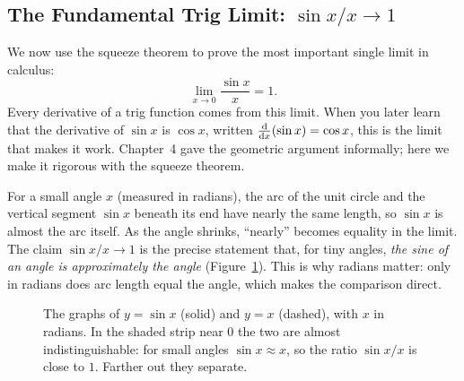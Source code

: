 \subsection{The Fundamental Trig Limit: $\sin x / x \to 1$}
\label{ch07:sinx}

We now use the squeeze theorem to prove the most important single limit in
calculus:
\[
  \boxed{\;\lim_{x\to 0}\frac{\sin x}{x} = 1.\;}
\]
Every derivative of a trig function comes from this limit.
When you later learn that the derivative of $\sin x$ is $\cos x$, written
$\frac{\mathrm{d}}{\mathrm{d} x}\!\left(\sin x\right) = \cos x$, this is the limit that makes it work.
Chapter~4 gave the geometric argument informally; here we make it rigorous with the squeeze theorem.

\begin{intuitionbox}
For a small angle $x$ (measured in radians), the arc of the unit circle and the
vertical segment $\sin x$ beneath its end have nearly the same length, so
$\sin x$ is almost the arc itself. As the angle shrinks, ``nearly'' becomes equality in the limit. The claim
$\sin x/x \to 1$ is the precise statement that, for tiny angles, \emph{the sine
of an angle is approximately the angle}
(Figure~\ref{ch07:fig-sin-approx}). This is why radians matter: only in
radians does arc length equal the angle, which makes the comparison direct.
\end{intuitionbox}

\begin{figure}[htbp]
\centering
{}
\caption{The graphs of $y=\sin x$ (solid) and $y=x$ (dashed), with $x$ in
radians. In the shaded strip near $0$ the two are almost indistinguishable:
for small angles $\sin x\approx x$, so the ratio $\sin x/x$ is close to $1$.
Farther out they separate.}
\label{ch07:fig-sin-approx}
\end{figure}

